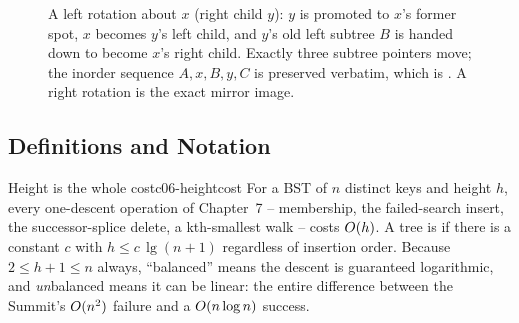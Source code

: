 \begin{figure}[H]
\centering
{}
\caption{A left rotation about $x$ (right child $y$): $y$ is promoted to $x$'s former spot, $x$
becomes $y$'s left child, and $y$'s old left subtree $B$ is handed down to become $x$'s right child.
Exactly three subtree pointers move; the inorder sequence $A,x,B,y,C$ is preserved verbatim, which is
. A right rotation is the exact mirror image.}\label{fig:c06-rot}
\end{figure}

\subsection{Definitions and Notation}

\begin{definition}{Height is the whole cost}{c06-heightcost}
For a BST of $n$ distinct keys and height $h$, every one-descent operation of Chapter~7 --
membership, the failed-search insert, the successor-splice delete, a kth-smallest walk -- costs
$O(h)$. A tree is  if there is a constant $c$ with $h \le c\,\lg(n+1)$
regardless of insertion order. Because $2 \le h+1 \le n$ always, ``balanced'' means the descent is
guaranteed logarithmic, and \emph{un}balanced means it can be linear: the entire difference between
the Summit's $O(n^2)$ failure and a $O(n\log n)$ success.
\end{definition}

